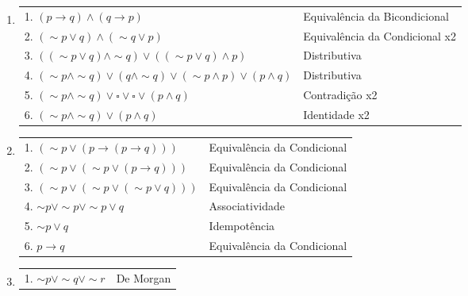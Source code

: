 \documentclass[12pt, a4paper,final]{article}
\begin{document}
\begin{enumerate}
\begin{enumerate}[label=(\alph*)]
            \item 
            
                \begin{tabular}{ll}
                    1. $(p \rightarrow q) \wedge (q \rightarrow p)$ & Equivalência da Bicondicional \\
                    2. $(\sim p \vee q) \wedge (\sim q \vee p)$ & Equivalência da Condicional x2 \\ 
                    3. $((\sim p \vee q) \wedge \sim q) \vee ((\sim p \vee q) \wedge p)$ & Distributiva \\
                    4. $(\sim p \wedge \sim q) \vee (q \wedge \sim q) \vee (\sim p \wedge p) \vee (p \wedge q)$ & Distributiva \\
                    5. $(\sim p \wedge \sim q) \vee \square \vee \square \vee (p \wedge q)$ & Contradição x2 \\
                    6. $(\sim p \wedge \sim q) \vee (p \wedge q)$ & Identidade x2 \\
                \end{tabular}
            
            \item 
            
                \begin{tabular}{ll}
                    1. $(\sim p \vee (p \rightarrow (p \rightarrow q)))$ & Equivalência da Condicional \\
                    2. $(\sim p \vee (\sim p \vee (p \rightarrow q)))$ & Equivalência da Condicional \\
                    3. $(\sim p \vee (\sim p \vee (\sim p \vee q)))$ & Equivalência da Condicional \\
                    4. $\sim p \vee \sim p \vee \sim p \vee q$ & Associatividade \\
                    5. $\sim p \vee q$ & Idempotência \\
                    6. $p \rightarrow q$ & Equivalência da Condicional \\
                \end{tabular}
            
            \item 
            
                \begin{tabular}{ll}
                    1. $\sim p \vee \sim q \vee \sim r$ & De Morgan \\
                \end{tabular}
            

\end{enumerate}
\end{enumerate}
\end{document}

